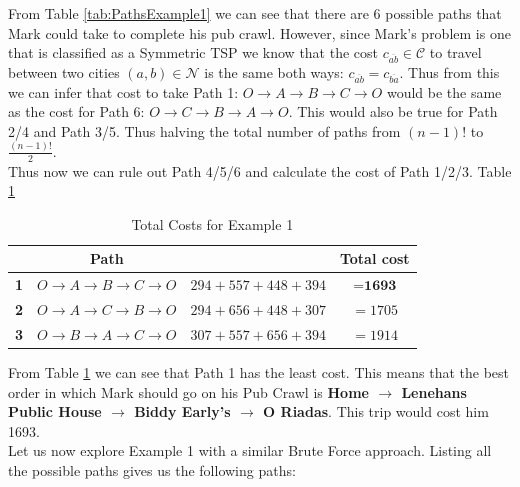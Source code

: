 \documentclass[a4paper]{article}
\begin{document}
From Table \ref{tab:PathsExample1} we can see that there are 6 possible paths that Mark could take to complete his pub crawl. However, since  Mark's problem is one that is classified as a Symmetric TSP we know that the cost $c_{\overline{ab}} \in \mathcal{C}$ to travel between two cities $(a,b) \in \mathcal{N}$ is the same both ways: $c_{\overline{ab}}=c_{\overline{ba}}$. Thus from this we can infer that cost to take Path 1: $O \to A \to B \to C \to O$ would be the same as the cost for Path 6: $O \to C \to B \to A \to O$. This would also be true for Path 2/4 and Path 3/5. Thus halving the total number of paths from $(n-1)!$ to $\frac{(n-1)!}{2}.$\\
Thus now we can rule out Path 4/5/6 and calculate the cost of Path 1/2/3. Table \ref{tab:pubCrawlTotalCosts}
\begin{table}[H]
    \centering
    \begin{tabular}{|c|c|cc|}
    \hline
    ~     & Path& & Total cost\\ 
    \hline
    \textbf{1}&$O\to A\to B\to C\to O$&$294+557+448+394$&$=\textbf{1693}$  \\
    \textbf{2}&$O\to A\to C\to B\to O$&$294+656+448+307$&$=1705$  \\
    \textbf{3}&$O\to B\to A\to C\to O$&$307+557+656+394$&$=1914$  \\
    \hline
    \end{tabular}
    \caption{Total Costs for Example 1}
    \label{tab:pubCrawlTotalCosts}
\end{table}
From Table \ref{tab:pubCrawlTotalCosts} we can see that Path 1 has the least cost. This means that the best order in which Mark should go on his Pub Crawl is \textbf{Home $\to$ Lenehans Public House $\to$ Biddy Early's $\to$ O Riadas}. This trip would cost him 1693.\\
Let us now explore Example 1 with a similar Brute Force approach. Listing all the possible paths gives us the following paths:
\end{document}
